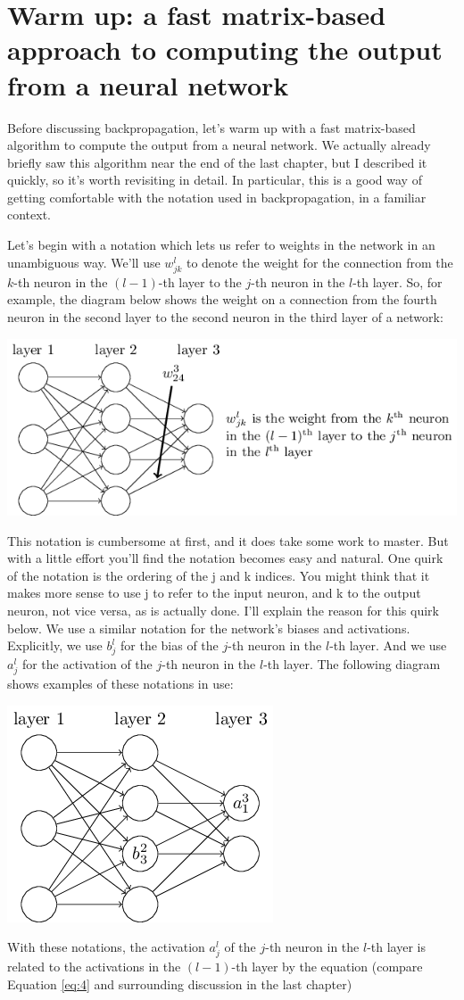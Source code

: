 \documentclass[a4paper,twoside,10pt]{book}
\begin{document}
\section{Warm up: a fast matrix-based approach to computing the output from a neural network}
Before discussing backpropagation, let's warm up with a fast matrix-based algorithm to compute the output from a neural network. We actually already briefly saw this algorithm near the end of the last chapter, but I described it quickly, so it's worth revisiting in detail. In particular, this is a good way of getting comfortable with the notation used in backpropagation, in a familiar context.

Let's begin with a notation which lets us refer to weights in the network in an unambiguous way. We'll use $w^l_{jk}$ to denote the weight for the connection from the $k$-th neuron in the $(l−1)$-th layer to the $j$-th neuron in the $l$-th layer. So, for example, the diagram below shows the weight on a connection from the fourth neuron in the second layer to the second neuron in the third layer of a network:

\begin{center}
	\includegraphics[width=0.7\linewidth]{./figures/ch2/tikz16}
\end{center}
This notation is cumbersome at first, and it does take some work to master. But with a little effort you'll find the notation becomes easy and natural. One quirk of the notation is the ordering of the j and k indices. You might think that it makes more sense to use j to refer to the input neuron, and k to the output neuron, not vice versa, as is actually done. I'll explain the reason for this quirk below.
We use a similar notation for the network's biases and activations. Explicitly, we use $b^l_j$ for the bias of the $j$-th neuron in the $l$-th layer. And we use $a^l_j$ for the activation of the $j$-th neuron in the $l$-th layer. The following diagram shows examples of these notations in use:
\begin{center}
\includegraphics[width=0.5\linewidth]{./figures/ch2/tikz17}
\end{center}
With these notations, the activation $a^l_j$ of the $j$-th neuron in the $l$-th layer is related to the activations in the $(l−1)$-th layer by the equation (compare Equation \ref{eq:4} and surrounding discussion in the last chapter)
\end{document}
